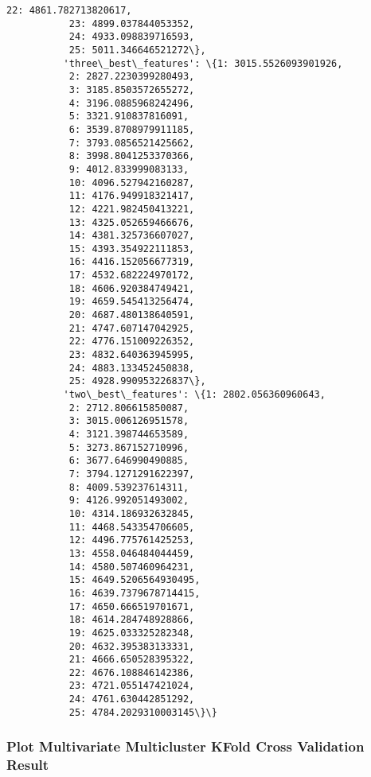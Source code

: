 \documentclass[11pt]{article}
\begin{document}
\begin{Verbatim}[commandchars=\\\{\}]
           22: 4861.782713820617,
           23: 4899.037844053352,
           24: 4933.098839716593,
           25: 5011.346646521272\},
          'three\_best\_features': \{1: 3015.5526093901926,
           2: 2827.2230399280493,
           3: 3185.8503572655272,
           4: 3196.0885968242496,
           5: 3321.910837816091,
           6: 3539.8708979911185,
           7: 3793.0856521425662,
           8: 3998.8041253370366,
           9: 4012.833999083133,
           10: 4096.527942160287,
           11: 4176.949918321417,
           12: 4221.982450413221,
           13: 4325.052659466676,
           14: 4381.325736607027,
           15: 4393.354922111853,
           16: 4416.152056677319,
           17: 4532.682224970172,
           18: 4606.920384749421,
           19: 4659.545413256474,
           20: 4687.480138640591,
           21: 4747.607147042925,
           22: 4776.151009226352,
           23: 4832.640363945995,
           24: 4883.133452450838,
           25: 4928.990953226837\},
          'two\_best\_features': \{1: 2802.056360960643,
           2: 2712.806615850087,
           3: 3015.006126951578,
           4: 3121.398744653589,
           5: 3273.867152710996,
           6: 3677.646990490885,
           7: 3794.1271291622397,
           8: 4009.539237614311,
           9: 4126.992051493002,
           10: 4314.186932632845,
           11: 4468.543354706605,
           12: 4496.775761425253,
           13: 4558.046484044459,
           14: 4580.507460964231,
           15: 4649.5206564930495,
           16: 4639.7379678714415,
           17: 4650.666519701671,
           18: 4614.284748928866,
           19: 4625.033325282348,
           20: 4632.395383133331,
           21: 4666.650528395322,
           22: 4676.108846142386,
           23: 4721.055147421024,
           24: 4761.630442851292,
           25: 4784.2029310003145\}\}
\end{Verbatim}
            
    \subsubsection{Plot Multivariate Multicluster KFold Cross Validation
Result}\label{plot-multivariate-multicluster-kfold-cross-validation-result}
\end{document}

